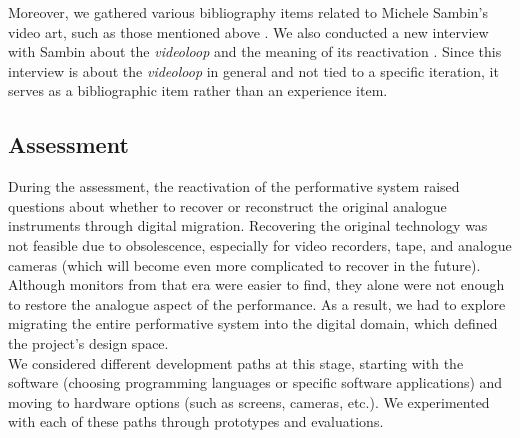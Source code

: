 Moreover, we gathered various bibliography items related to Michele Sambin’s video art, such as those mentioned above \cite{lischi2014michele, Leuzzi2015-bh, leuzzi2019re, d2021invenzioni, gallo2021intimacy, dimarino2022silvana, saba2022videoarte}. We also conducted a new interview with Sambin about the \textit{videoloop} and the meaning of its reactivation \cite{fiordelmondo2023toward}. Since this interview is about the \textit{videoloop} in general and not tied to a specific iteration, it serves as a bibliographic item rather than an experience item.

\subsection*{Assessment}
During the assessment, the reactivation of the performative system raised questions about whether to recover or reconstruct the original analogue instruments through digital migration. Recovering the original technology was not feasible due to obsolescence, especially for video recorders, tape, and analogue cameras (which will become even more complicated to recover in the future). Although monitors from that era were easier to find, they alone were not enough to restore the analogue aspect of the performance. As a result, we had to explore migrating the entire performative system into the digital domain, which defined the project's design space.\\
We considered different development paths at this stage, starting with the software (choosing programming languages or specific software applications) and moving to hardware options (such as screens, cameras, etc.). We experimented with each of these paths through prototypes and evaluations.

